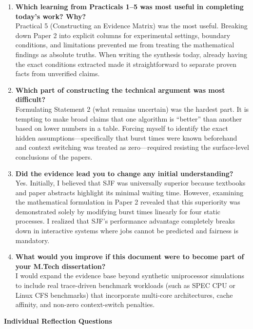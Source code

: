\documentclass[11pt]{article}
\begin{document}
\begin{enumerate}
    \item \textbf{Which learning from Practicals 1--5 was most useful in completing today's work? Why?} \\
    Practical 5 (Constructing an Evidence Matrix) was the most useful. Breaking down Paper 2 into explicit columns for experimental settings, boundary conditions, and limitations prevented me from treating the mathematical findings as absolute truths. When writing the synthesis today, already having the exact conditions extracted made it straightforward to separate proven facts from unverified claims.

    \item \textbf{Which part of constructing the technical argument was most difficult?} \\
    Formulating Statement 2 (what remains uncertain) was the hardest part. It is tempting to make broad claims that one algorithm is ``better'' than another based on lower numbers in a table. Forcing myself to identify the exact hidden assumptions---specifically that burst times were known beforehand and context switching was treated as zero---required resisting the surface-level conclusions of the papers.

    \item \textbf{Did the evidence lead you to change any initial understanding?} \\
    Yes. Initially, I believed that SJF was universally superior because textbooks and paper abstracts highlight its minimal waiting time. However, examining the mathematical formulation in Paper 2 revealed that this superiority was demonstrated solely by modifying burst times linearly for four static processes. I realized that SJF's performance advantage completely breaks down in interactive systems where jobs cannot be predicted and fairness is mandatory.

    \item \textbf{What would you improve if this document were to become part of your M.Tech dissertation?} \\
    I would expand the evidence base beyond synthetic uniprocessor simulations to include real trace-driven benchmark workloads (such as SPEC CPU or Linux CFS benchmarks) that incorporate multi-core architectures, cache affinity, and non-zero context-switch penalties.
\end{enumerate}

\newpage
{\centering\fontsize{16}{20}\selectfont\textbf{Individual Reflection Questions}\par}
\vspace{1em}
\end{document}
